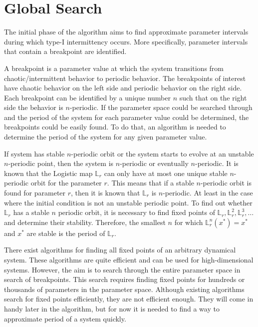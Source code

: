 \section{Global Search}
The initial phase of the algorithm aims to find approximate parameter intervals during which type-I intermittency occurs.
More specifically, parameter intervals that contain a breakpoint are identified.
\par
A breakpoint is a parameter value at which the system transitions from chaotic/intermittent behavior to periodic behavior.
The breakpoints of interest have chaotic behavior on the left side and periodic behavior on the right side.
Each breakpoint can be identified by a unique number $n$ such that on the right side the behavior is $n$-periodic.
If the parameter space could be searched through and the period of the system for each parameter value could be determined, the breakpoints could be easily found.
To do that, an algorithm is needed to determine the period of the system for any given parameter value.
\par
If system has stable $n$-periodic orbit or the system starts to evolve at an unstable $n$-periodic point, then the system is $n$-periodic or eventually $n$-periodic.
It is known that the Logistic map $\mathbb{L}_r$ can only have at most one unique stable $n$-periodic orbit for the parameter $r$.
This means that if a stable $n$-periodic orbit is found for parameter $r$, then it is known that $\mathbb{L}_r$ is $n$-periodic.
At least in the case where the initial condition is not an unstable periodic point.
To find out whether $\mathbb{L}_r$ has a stable $n$ periodic orbit, it is necessary to find fixed points of $\mathbb{L}_r, \mathbb{L}_{r}^{2}, \mathbb{L}_{r}^{3}, \dots$ and determine their stability.
Therefore, the smallest $n$ for which $\mathbb{L}_{r}^{n}(x^{*})=x^{*}$ and $x^{*}$ are stable is the period of $\mathbb{L}_r$.
\par
There exist algorithms for finding all fixed points of an arbitrary dynamical system.
These algorithms are quite efficient and can be used for high-dimensional systems.
However, the aim is to search through the entire parameter space in search of breakpoints.
This search requires finding fixed points for hundreds or thousands of parameters in the parameter space.
Although existing algorithms search for fixed points efficiently, they are not efficient enough.
They will come in handy later in the algorithm, but for now it is needed to find a way to approximate period of a system quickly.
\par
